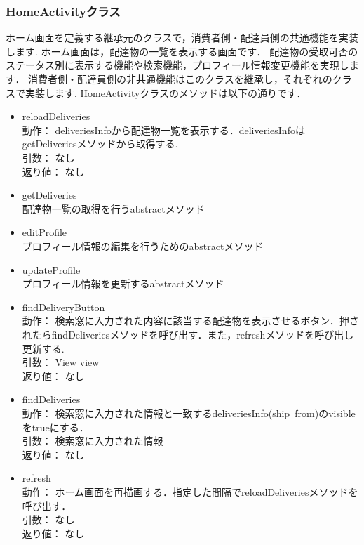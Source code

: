 \documentclass[a4j,titlepage]{jarticle}
\begin{document}
\subsubsection{HomeActivityクラス}
ホーム画面を定義する継承元のクラスで，消費者側・配達員側の共通機能を実装します.
ホーム画面は，配達物の一覧を表示する画面です．
配達物の受取可否のステータス別に表示する機能や検索機能，プロフィール情報変更機能を実現します．
消費者側・配達員側の非共通機能はこのクラスを継承し，それぞれのクラスで実装します.
HomeActivityクラスのメソッドは以下の通りです．
\begin{itemize}
\item reloadDeliveries\\
  動作： deliveriesInfoから配達物一覧を表示する．deliveriesInfoはgetDeliveriesメソッドから取得する.\\
  引数： なし\\
  返り値： なし

  \item getDeliveries\\
   配達物一覧の取得を行うabstractメソッド\\

  \item editProfile\\
   プロフィール情報の編集を行うためのabstractメソッド\\

  \item updateProfile\\
    プロフィール情報を更新するabstractメソッド\\

  \item findDeliveryButton\\
  動作：  検索窓に入力された内容に該当する配達物を表示させるボタン．押されたらfindDeliveriesメソッドを呼び出す．また，refreshメソッドを呼び出し更新する.\\
  引数：  View view\\
  返り値：  なし

  \item findDeliveries\\
  動作：  検索窓に入力された情報と一致するdeliveriesInfo(ship\verb|_|from)のvisibleをtrueにする．\\
  引数：  検索窓に入力された情報\\
  返り値：  なし
　
  \item refresh\\
  動作：  ホーム画面を再描画する．指定した間隔でreloadDeliveriesメソッドを呼び出す．\\
  引数：  なし\\
  返り値：  なし


\end{itemize}
\end{document}
